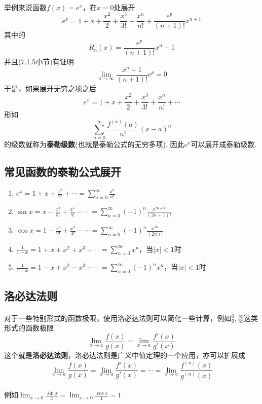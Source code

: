 \paragraph{}
举例来说函数$f(x) = e^x$，在$x = 0$处展开
$$
e^x = 1 + x + \frac{x^2}{2} + \frac{x^3}{3!} + \frac{x^n}{n!} + \frac{e^p}{(n+1)!} x^{n+1}
$$
其中的
$$
R_n(x) = \frac{e^p}{(n+1)!} x^n+1
$$
并且(7.1.5小节)有证明
$$
\lim_{n\to \infty}  \frac{x^n+1}{(n+1)!}  e^p = 0
$$
于是，如果展开无穷之项之后
$$
e^x = 1 + x + \frac{x^2}{2} + \frac{x^3}{3!} + \frac{x^n}{n!} + \cdots
$$
形如
$$
\sum _{n=0}^{\infty }{\frac {f^{(n)}(a)}{n!}}(x-a)^{n}
$$
的级数就称为\textbf{泰勒级数}(也就是泰勒公式的无穷多项). 因此$e^x$可以展开成泰勒级数.


\subsection{常见函数的泰勒公式展开}
\begin{enumerate}
\item $e^x = 1 + x + \frac{x^2}{2!} + \cdots  = \sum_{n=0}^\infty  \frac{x^n}{n!}$
\item $\sin{x} = x - \frac{x^3}{3!} + \frac{x^5}{5!} - \cdots = \sum_{n=0}^\infty (-1)^n \frac{x^{2n+1}}{(2n + 1)!}$
\item $\cos{x} = 1 - \frac{x^2}{2!} + \frac{x^4}{4!} - \cdots = \sum_{n=0}^\infty (-1)^n \frac{x^{2n}}{(2n)!}$
\item $\frac{1}{1 -x} = 1 + x + x^2 + x^3 + \cdots = \sum_{n=0}^\infty x^n$，当$|x| < 1$时
\item $\frac{1}{1 + x} = 1 - x + x^2 - x^3 + \cdots = \sum_{n=0}^\infty (-1)^n x^n$，当$|x| < 1$时
\end{enumerate}

\subsection{洛必达法则}
\paragraph{}
对于一些特别形式的函数极限，使用洛必达法则可以简化一些计算，例如$\frac{0}{0}, \frac{\infty}{\infty}$这类形式的函数极限
$$
\lim_{x\to a} \frac{f(x)}{g(x)} = \lim_{x\to a} \frac{f'(x)}{g'(x)}
$$
这个就是\textbf{洛必达法则}，洛必达法则是广义中值定理的一个应用，亦可以扩展成
$$
\lim_{x\to a} \frac{f(x)}{g(x)} = \lim_{x\to a} \frac{f'(x)}{g'(x)} = \cdots =  \lim_{x\to a} \frac{f^{(n)}(x)}{g^{(n)}(x)}
$$

\paragraph{}
例如$\lim_{x\to 0} \frac{\sin{x}}{x} = \lim_{x \to 0} \frac{\cos{x}}{1} = 1$

